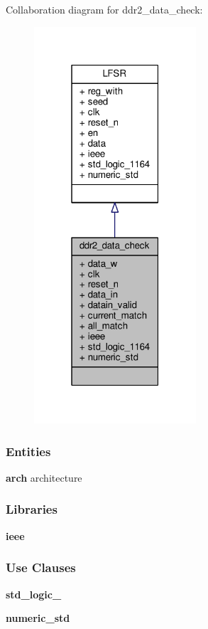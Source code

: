 Collaboration diagram for ddr2\+\_\+data\+\_\+check\+:\nopagebreak
\begin{figure}[H]
\begin{center}
\leavevmode
\includegraphics[width=171pt]{d4/d8a/classddr2__data__check__coll__graph}
\end{center}
\end{figure}
\subsubsection*{Entities}
\begin{DoxyCompactItemize}
\item 
{\bf arch} architecture
\end{DoxyCompactItemize}
\subsubsection*{Libraries}
 \begin{DoxyCompactItemize}
\item 
{\bf ieee} 
\end{DoxyCompactItemize}
\subsubsection*{Use Clauses}
 \begin{DoxyCompactItemize}
\item 
{\bf std\+\_\+logic\+\_}   
\item 
{\bf numeric\+\_\+std}   
\end{DoxyCompactItemize}
